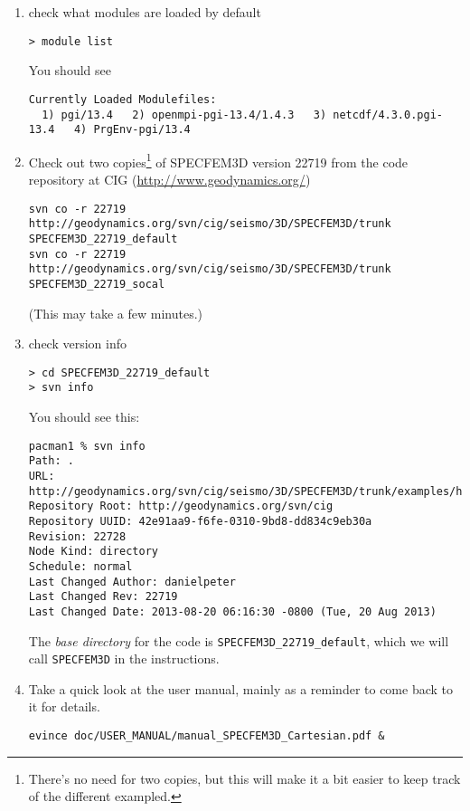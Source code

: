 \documentclass[10pt,fleqn,letterpaper]{article}
\begin{document}
\begin{enumerate}
\item check what modules are loaded by default
\begin{verbatim}
> module list
\end{verbatim}

You should see
\begin{verbatim}
Currently Loaded Modulefiles:
  1) pgi/13.4   2) openmpi-pgi-13.4/1.4.3   3) netcdf/4.3.0.pgi-13.4   4) PrgEnv-pgi/13.4
\end{verbatim}

\item Check out two copies\footnote{There's no need for two copies, but this will make it a bit easier to keep track of the different exampled.} of SPECFEM3D version 22719 from the code repository at CIG (\url{http://www.geodynamics.org/})
%
\begin{verbatim}
svn co -r 22719 http://geodynamics.org/svn/cig/seismo/3D/SPECFEM3D/trunk SPECFEM3D_22719_default
svn co -r 22719 http://geodynamics.org/svn/cig/seismo/3D/SPECFEM3D/trunk SPECFEM3D_22719_socal
\end{verbatim}
%
(This may take a few minutes.)

\item check version info
%
\begin{verbatim}
> cd SPECFEM3D_22719_default
> svn info
\end{verbatim}

You should see this:
\begin{verbatim}
pacman1 % svn info
Path: .
URL: http://geodynamics.org/svn/cig/seismo/3D/SPECFEM3D/trunk/examples/homogeneous_halfspace_HEX8_elastic_absorbing_Stacey_5sides
Repository Root: http://geodynamics.org/svn/cig
Repository UUID: 42e91aa9-f6fe-0310-9bd8-dd834c9eb30a
Revision: 22728
Node Kind: directory
Schedule: normal
Last Changed Author: danielpeter
Last Changed Rev: 22719
Last Changed Date: 2013-08-20 06:16:30 -0800 (Tue, 20 Aug 2013)
\end{verbatim}

The {\em base directory} for the code is \verb+SPECFEM3D_22719_default+, which we will call \verb+SPECFEM3D+ in the instructions.

\item Take a quick look at the user manual, mainly as a reminder to come back to it for details.
%
\begin{verbatim}
evince doc/USER_MANUAL/manual_SPECFEM3D_Cartesian.pdf &
\end{verbatim}


\end{enumerate}
\end{document}
